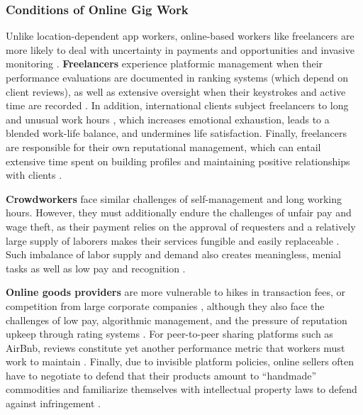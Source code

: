\subsubsection{Conditions of Online Gig Work}
Unlike location-dependent app workers, online-based workers like freelancers are more likely to deal with uncertainty in payments and opportunities \cite{Kitamura2021-gh,making} and invasive monitoring \cite{Popiel2017-wu}. \textbf{Freelancers} experience platformic management when their performance evaluations are documented in ranking systems (which depend on client reviews), as well as extensive oversight when their keystrokes and active time are recorded \cite{alvarez2022design}. In addition, international clients subject freelancers to long and unusual work hours \cite{Shevchuk2021-qh,Shevchuk_Strebkov_Davis_2019}, which increases emotional exhaustion, leads to a blended work-life balance, and undermines life satisfaction. Finally, freelancers are responsible for their own reputational management, which can entail extensive time spent on building profiles and maintaining positive relationships with clients \cite{Kitamura2021-gh,personal}.

\textbf{Crowdworkers} face similar challenges of self-management and long working hours. However, they must additionally endure the challenges of unfair pay \cite{Barbosa2019-kp} and wage theft, as their payment relies on the approval of requesters and a relatively large supply of laborers makes their services fungible and easily replaceable \cite{irani2013turkopticon}. Such imbalance of labor supply and demand also creates meaningless, menial tasks as well as low pay and recognition \cite{Kittur2013-jd,Durward2020-vh}.

\textbf{Online goods providers} are more vulnerable to hikes in transaction fees, or competition from large corporate companies \cite{West_undated-no}, although they also face the challenges of low pay, algorithmic management, and the pressure of reputation upkeep through rating systems \cite{Benson2020-it}. For peer-to-peer sharing platforms such as AirBnb, reviews constitute yet another performance metric that workers must work to maintain \cite{Lawani2019-ry}. Finally, due to invisible platform policies, online sellers often have to negotiate to defend that their products amount to ``handmade'' commodities and familiarize themselves with intellectual property laws to defend against infringement \cite{Razaq2022-lq}. 

